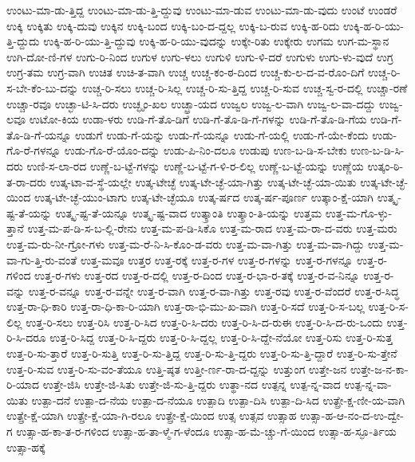 {ಉಂಟು-ಮಾ-ಡು-ತ್ತಿದ್ದ
ಉಂಟು-ಮಾ-ಡು-ತ್ತಿ-ದ್ದುವು
ಉಂಟು-ಮಾ-ಡುವ
ಉಂಟು-ಮಾ-ಡು-ವುದು
ಉಂಟೆ
ಉಂಡರೆ
ಉಕ್ಕಿ
ಉಕ್ಕಿತು
ಉಕ್ಕಿ-ದುವು
ಉಕ್ಕಿನ
ಉಕ್ಕಿ-ಬಂದ
ಉಕ್ಕಿ-ಬಂ-ದ-ದ್ದಲ್ಲ
ಉಕ್ಕಿ-ಬ-ರುವ
ಉಕ್ಕಿ-ಹ-ರಿದು
ಉಕ್ಕಿ-ಹ-ರಿ-ಯು-ತ್ತಿ-ದ್ದುದು
ಉಕ್ಕಿ-ಹ-ರಿ-ಯು-ತ್ತಿ-ದ್ದುವು
ಉಕ್ಕಿ-ಹ-ರಿ-ಯು-ವುದನ್ನು
ಉಕ್ಕೇ-ರಿತು
ಉಕ್ಕೇರು
ಉಗಮ
ಉಗ-ಮ-ಸ್ಥಾನ
ಉಗಿ-ದೋ-ಣಿ-ಗಳ
ಉಗು-ರಿ-ನಿಂದ
ಉಗುಳ
ಉಗು-ಳಲು
ಉಗುಳಿ
ಉಗು-ಳಿ-ದರೆ
ಉಗುಳು
ಉಗು-ಳು-ವುದೆ
ಉಗ್ರ
ಉಗ್ರ-ತಮ
ಉಗ್ರ-ವಾಗಿ
ಉಚಿತ
ಉಚಿ-ತ-ವಾಗಿ
ಉಚ್ಚ
ಉಚ್ಚ-ಕಂ-ಠ-ದಿಂದ
ಉಚ್ಚ-ಕು-ಲ-ದ-ವ-ರೊಂ-ದಿಗೆ
ಉಚ್ಚ-ರಿ-ಸ-ಬೇ-ಕೆಂ-ಬು-ದನ್ನು
ಉಚ್ಚ-ರಿ-ಸಲು
ಉಚ್ಚ-ರಿ-ಸಿಲ್ಲ
ಉಚ್ಚ-ರಿ-ಸು-ತ್ತಿದ್ದ
ಉಚ್ಚ-ರಿ-ಸುವ
ಉಚ್ಚ-ಸ್ವ-ರ-ದಲ್ಲಿ
ಉಚ್ಚಾ-ರಣೆ
ಉಚ್ಚಾ-ರವೂ
ಉಚ್ಛಾ-ಟಿ-ಸಿ-ದರು
ಉಚ್ಛೃಂ-ಖಲ
ಉಚ್ಛ್ರಾ-ಯದ
ಉಜ್ವಲ
ಉಜ್ವ-ಲ-ವಾಗಿ
ಉಜ್ವ-ಲ-ವಾ-ದದ್ದು
ಉಜ್ವ-ಲವೂ
ಉಟೋ-ಕಿಯ
ಉಡಾ-ಳರು
ಉಡಿ-ಗೆ-ತೊ-ಡಿಗೆ
ಉಡಿ-ಗೆ-ತೊ-ಡಿ-ಗೆ-ಗಳನ್ನು
ಉಡಿ-ಗೆ-ತೊ-ಡಿ-ಗೆಯ
ಉಡಿ-ಗೆ-ತೊ-ಡಿ-ಗೆ-ಯನ್ನೂ
ಉಡುಗೆ
ಉಡು-ಗೆ-ಯನ್ನು
ಉಡು-ಗೆ-ಯನ್ನೂ
ಉಡು-ಗೆ-ಯಲ್ಲಿ
ಉಡು-ಗೆ-ಯೇ-ಕೆಂದು
ಉಡು-ಗೊ-ರೆ-ಗಳನ್ನೂ
ಉಡು-ಗೊ-ರೆ-ಯೊಂ-ದನ್ನು
ಉಡು-ಪಿ-ನಿಂ-ದಲೂ
ಉಡುಪು
ಉಣ-ಬ-ಡಿ-ಸ-ಬೇಕು
ಉಣ-ಬ-ಡಿ-ಸಿ-ದರು
ಉಣಿ-ಸ-ಲಾ-ರದ
ಉಣ್ಣೆ-ಬ-ಟ್ಟೆ-ಗಳನ್ನು
ಉಣ್ಣೆ-ಬ-ಟ್ಟೆ-ಗ-ಳಿ-ರ-ಲಿಲ್ಲ
ಉಣ್ಣೆ-ಬ-ಟ್ಟೆ-ಯನ್ನು
ಉಣ್ಣೆಯ
ಉತ್ಕಂ-ಠಿ-ತ-ರಾ-ದರು
ಉತ್ಕ-ಟಾ-ವ-ಸ್ಥೆ-ಯಲ್ಲೇ
ಉತ್ಕ-ಟೇಚ್ಛೆ
ಉತ್ಕ-ಟೇ-ಚ್ಛೆ-ಯಾ-ಗಿತ್ತು
ಉತ್ಕ-ಟೇ-ಚ್ಛೆ-ಯಾ-ಯಿತು
ಉತ್ಕ-ಟೇ-ಚ್ಛೆ-ಯಿಂದ
ಉತ್ಕ-ಟೇ-ಚ್ಛೆ-ಯುಂ-ಟಾಗು
ಉತ್ಕ-ಟೇ-ಚ್ಛೆಯೂ
ಉತ್ಕ-ರ್ಷದ
ಉತ್ಕ-ರ್ಷ-ಪೂರ್ಣ
ಉತ್ಕಾಂ-ಕ್ಷೆ-ಯಾಗಿ
ಉತ್ಕೃ-ಷ್ಟ-ತೆ-ಯನ್ನು
ಉತ್ಕೃ-ಷ್ಟ-ತೆ-ಯನ್ನೂ
ಉತ್ಕೃ-ಷ್ಟ-ವಾದ
ಉತ್ಕ್ರಾಂತಿ
ಉತ್ಕ್ರಾಂ-ತಿ-ಯನ್ನು
ಉತ್ತಮ
ಉತ್ತ-ಮ-ಗೊ-ಳ್ಳು-ತ್ತಾನೆ
ಉತ್ತ-ಮ-ಪ-ಡಿ-ಸ-ಬ-ಲ್ಲಿ-ರೇನು
ಉತ್ತ-ಮ-ಪ-ಡಿ-ಸಿಕೊ
ಉತ್ತ-ಮ-ರಾದ
ಉತ್ತ-ಮ-ರಾ-ದ-ವರು
ಉತ್ತ-ಮರು
ಉತ್ತ-ಮ-ರು-ನೀ-ಗ್ರೋ-ಗಳು
ಉತ್ತ-ಮ-ರೆ-ನಿ-ಸಿ-ಕೊಂ-ಡ-ವರು
ಉತ್ತ-ಮ-ವಾ-ಗಿತ್ತು
ಉತ್ತ-ಮ-ವಾ-ಗಿದ್ದು
ಉತ್ತ-ಮ-ವಾ-ಗು-ತ್ತಿ-ರು-ವಂತೆ
ಉತ್ತ-ಮವೂ
ಉತ್ತರ
ಉತ್ತ-ರಕ್ಕೆ
ಉತ್ತ-ರ-ಗಳ
ಉತ್ತ-ರ-ಗಳನ್ನು
ಉತ್ತ-ರ-ಗಳನ್ನೂ
ಉತ್ತ-ರ-ಗಳಿಂದ
ಉತ್ತ-ರ-ಗಳು
ಉತ್ತ-ರದ
ಉತ್ತ-ರ-ದಲ್ಲಿ
ಉತ್ತ-ರ-ದಿಂದ
ಉತ್ತ-ರ-ಭಾ-ರ-ತಕ್ಕೆ
ಉತ್ತ-ರ-ವ-ನಿನ್ನೂ
ಉತ್ತ-ರ-ವನ್ನು
ಉತ್ತ-ರ-ವನ್ನೂ
ಉತ್ತ-ರ-ವನ್ನೇ
ಉತ್ತ-ರ-ವಾಗಿ
ಉತ್ತ-ರ-ವಾ-ಗಿತ್ತು
ಉತ್ತ-ರವು
ಉತ್ತ-ರ-ವೆಂದರೆ
ಉತ್ತ-ರ-ಸಿದ್ಧ
ಉತ್ತ-ರಾ-ಧಿ-ಕಾರಿ
ಉತ್ತ-ರಾ-ಧಿ-ಕಾ-ರಿ-ಯಾಗಿ
ಉತ್ತ-ರಾ-ಭಿ-ಮು-ಖ-ವಾಗಿ
ಉತ್ತ-ರಿ-ಸದೆ
ಉತ್ತ-ರಿ-ಸ-ಬಲ್ಲ
ಉತ್ತ-ರಿ-ಸ-ಲಿಲ್ಲ
ಉತ್ತ-ರಿ-ಸಲು
ಉತ್ತ-ರಿಸಿ
ಉತ್ತ-ರಿ-ಸಿದ
ಉತ್ತ-ರಿ-ಸಿ-ದರು
ಉತ್ತ-ರಿ-ಸಿ-ದ-ರುಈ
ಉತ್ತ-ರಿ-ಸಿ-ದ-ರು-ಒಂದು
ಉತ್ತ-ರಿ-ಸಿ-ದರೂ
ಉತ್ತ-ರಿ-ಸಿದ್ದ
ಉತ್ತ-ರಿ-ಸಿ-ದ್ದರು
ಉತ್ತ-ರಿ-ಸಿ-ದ್ದಲ್ಲ
ಉತ್ತ-ರಿ-ಸಿ-ದ್ದೇ-ನೆಯೋ
ಉತ್ತ-ರಿಸು
ಉತ್ತ-ರಿ-ಸುತ್ತ
ಉತ್ತ-ರಿ-ಸು-ತ್ತಾರೆ
ಉತ್ತ-ರಿ-ಸುತ್ತಿ
ಉತ್ತ-ರಿ-ಸು-ತ್ತಿದ್ದ
ಉತ್ತ-ರಿ-ಸು-ತ್ತಿ-ದ್ದರು
ಉತ್ತ-ರಿ-ಸು-ತ್ತಿ-ದ್ದಾರೆ
ಉತ್ತ-ರಿ-ಸು-ತ್ತೇನೆ
ಉತ್ತ-ರಿ-ಸುವ
ಉತ್ತ-ರಿ-ಸು-ವಂ-ತೆಯೂ
ಉತ್ತಿ-ಷ್ಠತ
ಉತ್ತೀ-ರ್ಣ-ರಾ-ದ-ದ್ದನ್ನು
ಉತ್ತುಂಗ
ಉತ್ತೇ-ಜನ
ಉತ್ತೇ-ಜ-ನ-ಕಾ-ರಿ-ಯಾದ
ಉತ್ತೇ-ಜಿಸಿ
ಉತ್ತೇ-ಜಿ-ಸಿತು
ಉತ್ತೇ-ಜಿ-ಸು-ತ್ತಿ-ದ್ದರು
ಉತ್ಥಾ-ನದ
ಉತ್ಪನ್ನ
ಉತ್ಪ-ನ್ನ-ವಾದ
ಉತ್ಪ-ನ್ನ-ವಾ-ಯಿತು
ಉತ್ಪಾ-ದನೆ
ಉತ್ಪಾ-ದ-ನೆಯ
ಉತ್ಪಾ-ದ-ನೆಯೂ
ಉತ್ಪಾದಿ
ಉತ್ಪಾ-ದಿಸಿ
ಉತ್ಪಾ-ದಿ-ಸಿದ
ಉತ್ಪ್ರೇ-ಕ್ಷ-ಣೀ-ಯ-ವಾಗಿ
ಉತ್ಪ್ರೇ-ಕ್ಷೆ-ಯಾಗಿ
ಉತ್ಪ್ರೇ-ಕ್ಷೆ-ಯಾ-ಗಿ-ರಲೂ
ಉತ್ಪ್ರೇ-ಕ್ಷೆ-ಯಿಂದ
ಉತ್ಸ
ಉತ್ಸವ
ಉತ್ಸಾಹ
ಉತ್ಸಾ-ಹ-ಆ-ನಂ-ದ-ಉ-ದ್ವೇ-ಗ
ಉತ್ಸಾ-ಹ-ಕಾ-ತ-ರ-ಗಳಿಂದ
ಉತ್ಸಾ-ಹ-ತಾ-ಳ್ಮೆ-ಗ-ಳೆಂದೂ
ಉತ್ಸಾ-ಹ-ಮೆ-ಚ್ಚು-ಗೆ-ಯಿಂದ
ಉತ್ಸಾ-ಹ-ಸ್ಫೂ-ರ್ತಿಯ
ಉತ್ಸಾ-ಹಕ್ಕೆ
}
